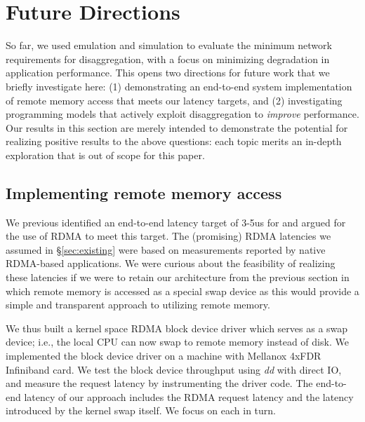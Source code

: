 \vspace{-0.1in}
\section{Future Directions}
\label{sec:future}
\vspace{-0.05in}

So far, we used emulation and simulation to evaluate the minimum network requirements for \dis disaggregation, with a focus on minimizing degradation in application performance. 
This opens two directions for future work that we briefly investigate here: (1) demonstrating an end-to-end system implementation of remote memory access that meets our latency targets, and (2) investigating programming models that actively exploit disaggregation to \emph{improve} performance.
Our results in this section are merely intended to demonstrate the potential for realizing positive results to the above questions: each topic merits an in-depth exploration that is out of scope for this paper.


\vspace{-0.1in}
\subsection{Implementing remote memory access}
\vspace{-0.05in}
We previous identified an end-to-end latency target of 3-5us for \dis and argued for the use of  RDMA to meet this target. The (promising) RDMA latencies we assumed in \S\ref{sec:existing} were based on measurements reported by native RDMA-based applications. 
We were curious about the feasibility of realizing these latencies if we were to retain our 
architecture from the previous section in which remote memory is accessed as a special swap device as this would provide a simple and transparent approach to utilizing remote memory. 

We thus built a kernel space RDMA block device driver which serves as a swap device; i.e., the local CPU can now swap to remote memory instead of disk.
We implemented the block device driver on a machine with Mellanox  4xFDR Infiniband card.
We test the block device throughput using \textit{dd} with direct IO, and measure the request latency by instrumenting the driver code. 
The end-to-end latency of our approach includes the RDMA request latency and the latency introduced by the kernel swap itself. We focus on each in turn. 


